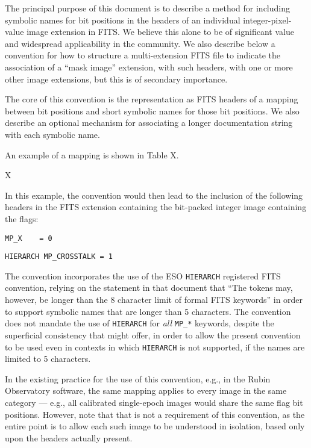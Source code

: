 \documentclass[DM,authoryear,toc]{lsstdoc}
\begin{document}
The principal purpose of this document is to describe a method for
including symbolic names for bit positions in the headers of an
individual integer-pixel-value image extension in FITS.
We believe this alone to be of significant value and widespread
applicability in the community.
We also describe below a convention for how to structure a
multi-extension FITS file to indicate the association of a ``mask
image'' extension, with such headers, with one or more other
image extensions, but this is of secondary importance.

The core of this convention is the representation as FITS headers
of a mapping between bit positions and short symbolic names for
those bit positions.
We also describe an optional mechanism for associating a longer
documentation string with each symbolic name.

An example of a mapping is shown in Table X.

X

In this example, the convention would then lead to the inclusion
of the following headers in the FITS extension containing the
bit-packed integer image containing the flags:

\verb|MP_X    = 0|

\verb|HIERARCH MP_CROSSTALK = 1|

The convention incorporates the use of the ESO \verb|HIERARCH|
registered FITS convention,
relying on the statement in that document that ``The tokens may,
however, be longer than the 8 character limit of formal FITS
keywords'' in order to support symbolic names that are longer
than 5 characters.
The convention does not mandate the use of \verb|HIERARCH| for
\emph{all} \verb|MP_*| keywords, despite the superficial
consistency that might offer, in order to allow the present
convention to be used even in contexts in which \verb|HIERARCH|
is not supported, if the names are limited to 5 characters.

In the existing practice for the use of this convention,
e.g., in the Rubin Observatory software, the same mapping applies
to every image in the same category --- e.g., all calibrated
single-epoch images would share the same flag bit positions.
However, note that that is not a requirement of this convention,
as the entire point is to allow each such image to be understood
in isolation, based only upon the headers actually present.
\end{document}
